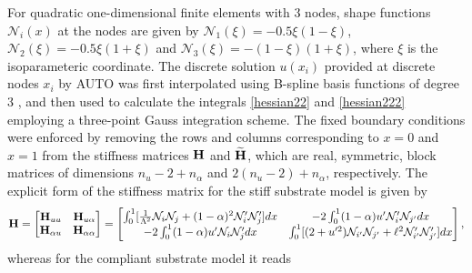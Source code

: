 \documentclass[10pt]{article}
\begin{document}
For quadratic one-dimensional finite elements with 3 nodes, shape functions   ${\mathcal N}_i(x)$ at the nodes  are given by ${\mathcal N}_1(\xi)=-0.5\xi(1-\xi)$, ${\mathcal N}_2(\xi)=-0.5\xi(1+\xi)$ and ${\mathcal N}_3(\xi)=-(1-\xi)(1+\xi)$, where $\xi$ is the isoparameteric coordinate. The discrete solution $u(x_i)$ provided at discrete nodes $x_i$ by AUTO was first interpolated using B-spline basis functions of degree 3 \cite{Grimstad2016-cq}, and then used to calculate the integrals \eqref{hessian22} and \ref{hessian222} employing a three-point Gauss integration scheme. The fixed boundary conditions were enforced by removing the rows and columns corresponding to $x = 0$ and $x = 1$ from the stiffness matrices
%
$\mathbf{H}$ and $\widetilde{\mathbf{H}}$, {which are real, symmetric, block matrices of dimensions ${n_u-2 + n_\alpha}$ and ${2(n_u-2) + n_\alpha}$, respectively}. The explicit form of the stiffness matrix for the stiff substrate model is given by
\begin{equation}
    \mathbf{H} =
    \begin{bmatrix}
        \mathbf{H}_{uu}       & \mathbf{H}_{u\alpha}      \\
        \mathbf{H}_{\alpha u} & \mathbf{H}_{\alpha\alpha}
    \end{bmatrix}
    =
    \begin{bmatrix}
        \int_0^1[ \frac{1}{\Lambda^2}{\mathcal N}_i{\mathcal N}_j + (1-\alpha)^2{\mathcal N}'_i{\mathcal N}'_j
        ] dx &
        -2\int_0^1(1-\alpha)u' {\mathcal N}'_i {\mathcal N}_{{j'}}  dx                                                            \\
        -2\int_0^1(1-\alpha)u' {\mathcal N}_i {\mathcal N}'_j dx
             & \int_0^1 [ (2+u'^2){\mathcal N}_{{i'}}{\mathcal N}_{{j'}} +\ell^2{\mathcal N}'_{{i'}}{\mathcal N}'_{{j'}}] dx
    \end{bmatrix},
    \label{eq:stifness1}
\end{equation}
whereas for the compliant substrate model it reads
%
\end{document}
